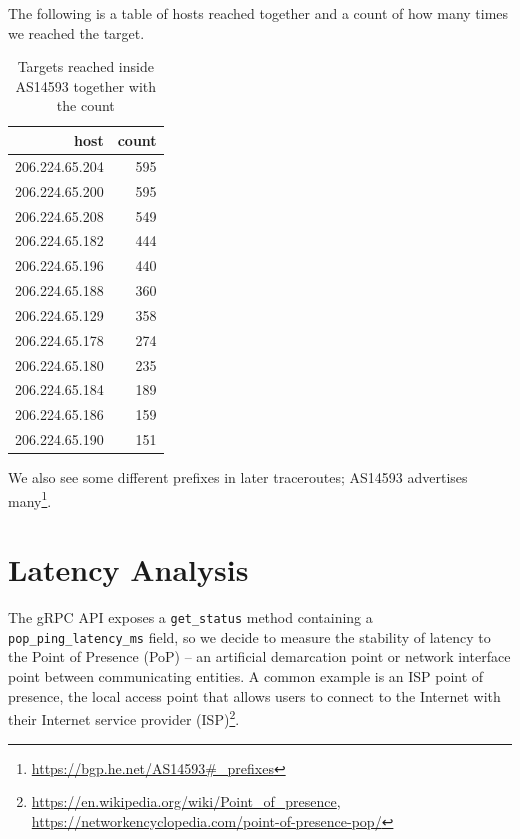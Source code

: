 \documentclass[IN,11pt,twoside,openright,idp,english]{tumthesis}
\begin{document}
The following is a table of hosts reached together and a count of how many times we reached the target.
    
\begin{table}
    \centering
    \begin{tabular}{ r r }
        \toprule
            host           & count \\ 
            \midrule
            206.224.65.204 & 595   \\
            206.224.65.200 & 595   \\
            206.224.65.208 & 549   \\ 
            206.224.65.182 & 444   \\
            206.224.65.196 & 440   \\ 
            206.224.65.188 & 360   \\ 
            206.224.65.129 & 358   \\ 
            206.224.65.178 & 274   \\ 
            206.224.65.180 & 235   \\ 
            206.224.65.184 & 189   \\ 
            206.224.65.186 & 159   \\ 
            206.224.65.190 & 151   \\
            \bottomrule
    \end{tabular}
    \caption{Targets reached inside AS14593 together with the count}
\end{table}

We also see some different prefixes in later traceroutes; AS14593 advertises
many\footnote{\url{https://bgp.he.net/AS14593\#_prefixes}}.
    
\section{Latency Analysis}

The gRPC API exposes a \texttt{get\_status} method containing a \texttt{pop\_ping\_latency\_ms} field, so we decide to
measure the stability of latency to the Point of Presence (PoP) -- an artificial demarcation point or network interface
point between communicating entities. A common example is an ISP point of presence, the local access point that allows
users to connect to the Internet with their Internet service provider
(ISP)\footnote{\url{https://en.wikipedia.org/wiki/Point_of_presence},
\url{https://networkencyclopedia.com/point-of-presence-pop/}}.
\end{document}
